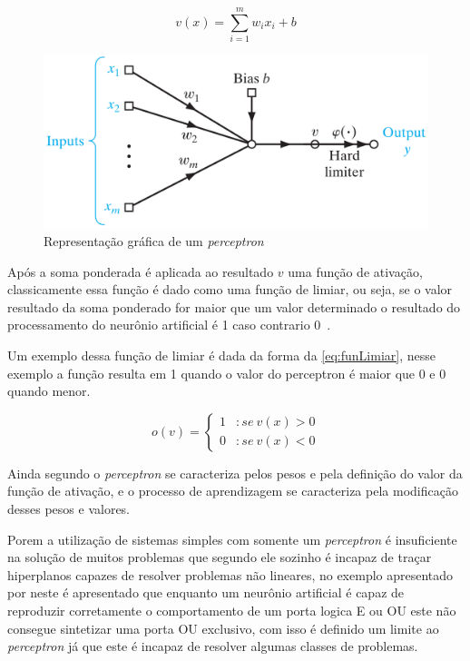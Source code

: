 \documentclass[
    12pt,
    oneside,
    a4paper,
    english,
    brazil
]{abntex2}
\begin{document}
\begin{equation}\label{eq:perceptron}
    v(x) = \sum_{i=1}^{m}{w_i  x_i + b}
\end{equation}

\begin{figure}[ht]
    \centering
    \caption{Representação gráfica de um \textit{perceptron}}\label{fig:perceptron}
    \includegraphics[width=.5\linewidth]{images/perceptron.png}
\end{figure}

Após  a soma  ponderada é  aplicada ao  resultado $v$  uma função  de ativação,
classicamente essa função é dado como uma função de limiar, ou seja, se o valor
resultado da soma  ponderado for maior que um valor  determinado o resultado do
processamento do neurônio artificial é 1 caso contrario 0~\cite{knight}.

Um exemplo  dessa função de limiar  é dada da forma  da \autoref{eq:funLimiar},
nesse exemplo a função resulta em 1 quando  o valor do perceptron é maior que 0
e 0 quando menor.

\begin{equation}
    \label{eq:funLimiar}
    o(v) = \left\{
        \begin{array}{lr}
            1 & :se\  v(x) > 0\\
            0 & :se\  v(x) < 0
        \end{array}
    \right.
\end{equation}

Ainda segundo   o  \textit{perceptron} se  caracteriza pelos
pesos  e pela  definição  do valor  da  função  de ativação,  e  o processo  de
aprendizagem se caracteriza pela modificação desses pesos e valores.

Porem a  utilização de  sistemas simples com  somente um  \textit{perceptron} é
insuficiente na solução de muitos problemas que segundo  ele
sozinho  é incapaz  de traçar  hiperplanos  capazes de  resolver problemas  não
lineares, no  exemplo apresentado  por  neste  é apresentado
que  enquanto um  neurônio  artificial  é capaz  de  reproduzir corretamente  o
comportamento de um porta logica E ou OU este não consegue sintetizar uma porta
OU exclusivo, com isso é definido um limite ao \textit{perceptron} já que este
é incapaz de resolver algumas classes de problemas.
\end{document}
